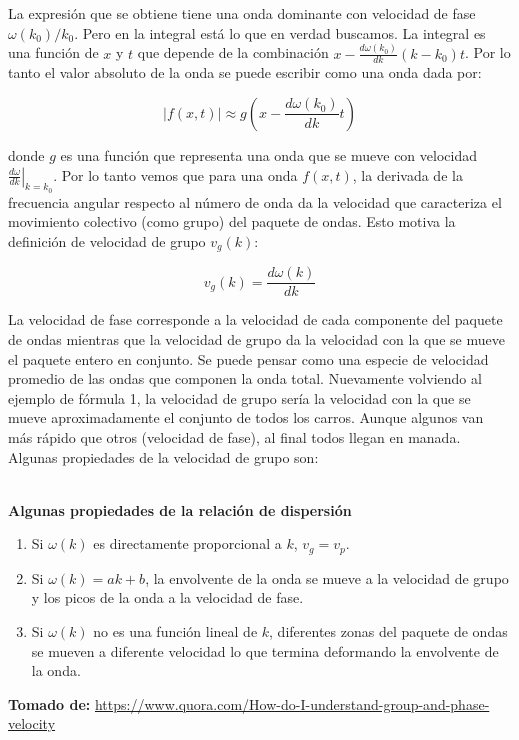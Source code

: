 \documentclass[12pt]{article}
\begin{document}
 
 La expresión que se obtiene tiene una onda dominante con velocidad de fase $\omega(k_0)/k_0$. Pero en la integral está lo que en verdad buscamos. La integral es una función de $x$ y $t$ que depende de la combinación $x - \frac{d \omega(k_0)}{dk} (k-k_0)t$. Por lo tanto el valor absoluto de la onda se puede escribir como una onda dada por:
 
 \begin{equation}
 |f(x,t)| \approx   g\left(x - \frac{d \omega(k_0)}{dk}t\right)
 \end{equation}
 
 donde $g$ es una función que representa una onda que se mueve con velocidad $\left.\frac{d \omega}{dk}\right|_{k=k_0}$. Por lo tanto vemos que para una onda $f(x,t)$, la derivada de la frecuencia angular respecto al número de onda da la velocidad que caracteriza el movimiento colectivo (como grupo) del paquete de ondas. Esto motiva la definición de velocidad de grupo $v_g(k)$:
 
 \begin{equation}
 v_g(k) = \frac{d\omega(k)}{dk} 
 \end{equation}
 
 La velocidad de fase corresponde a la velocidad de cada componente del paquete de ondas mientras que la velocidad de grupo da la velocidad con la que se mueve el paquete entero en conjunto. Se puede pensar como una especie de velocidad promedio de las ondas que componen la onda total. Nuevamente volviendo al ejemplo de fórmula 1, la velocidad de grupo sería la velocidad con la que se mueve aproximadamente el conjunto de todos los carros. Aunque algunos van más rápido que otros (velocidad de fase), al final todos llegan en manada. Algunas propiedades de la velocidad de grupo son:\\
\\ 
 \begin{center}
 	\textbf{Algunas propiedades de la relación de dispersión}
 \end{center}
\begin{enumerate}
	\item Si $\omega(k)$ es directamente proporcional a $k$, $v_g = v_p$. 
	\item Si $\omega(k)= ak + b$, la envolvente de la onda se mueve a la velocidad de grupo y los picos de la onda a la velocidad de fase.
	\item Si $\omega(k)$ no es una función lineal de $k$, diferentes zonas del paquete de ondas se mueven a diferente velocidad lo que termina deformando la envolvente de la onda. 
\end{enumerate}
 
 
\textbf{Tomado de:} \url{https://www.quora.com/How-do-I-understand-group-and-phase-velocity}
 
\end{document}
